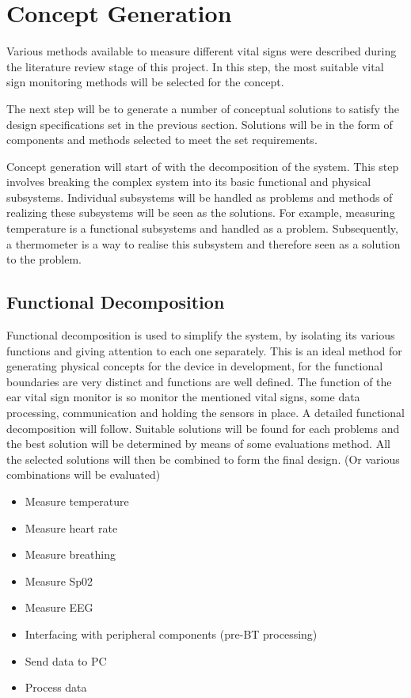 \section{Concept Generation}
Various methods available to measure different vital signs were described during the literature review stage of this project. In this step, the most suitable vital sign monitoring methods will be selected for the concept.

The next step will be to generate a number of conceptual solutions to satisfy the design specifications set in the previous section. Solutions will be in the form of components and methods selected to meet the set requirements.

Concept generation will start of with the decomposition of the system. This step involves breaking the complex system into its basic functional and physical subsystems. Individual subsystems will be handled as problems and methods of realizing these subsystems will be seen as the solutions. For example, measuring temperature is a functional subsystems and handled as a problem. Subsequently, a thermometer is a way to realise this subsystem and therefore seen as a solution to the problem.

\subsection{Functional Decomposition}
Functional decomposition is used to simplify the system, by isolating its various functions and giving attention to each one separately. This is an ideal method for generating physical concepts for the device in development, for the functional boundaries are very distinct and functions are well defined. The function of the ear vital sign monitor is so monitor the mentioned vital signs, some data processing, communication and holding the sensors in place. A detailed functional decomposition will follow.  Suitable solutions will be found for each problems and the best solution will be determined by means of some evaluations method. All the selected solutions will then be combined to form the final design. (Or various combinations will be evaluated)

\begin{itemize}
\item Measure temperature
\item Measure heart rate
\item Measure breathing
\item Measure Sp02
\item Measure EEG
\item Interfacing with peripheral components (pre-BT processing)
\item Send data to PC
\item Process data
\end{itemize}






